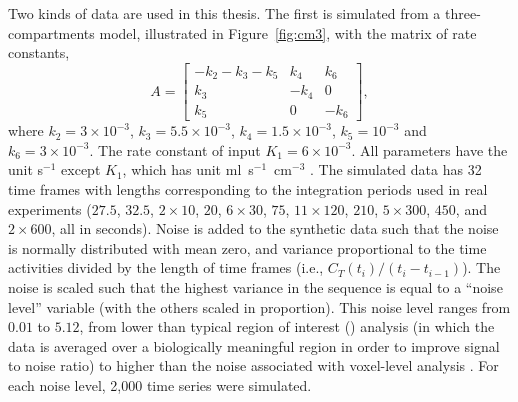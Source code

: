 Two kinds of data are used in this thesis. The first is simulated from a
three-compartments model, illustrated in Figure~\ref{fig:cm3}, with the
matrix of rate constants,
\begin{equation}
  A = \begin{bmatrix}
    - k_2 - k_3 - k_5 & k_4  & k_6 \\
    k_3               & -k_4 & 0   \\
    k_5               & 0    & -k_6
  \end{bmatrix},
\end{equation}
where $k_2 = 3 \times 10^{-3}$, $k_3 = 5.5 \times 10^{-3}$, $k_4 = 1.5 \times
10^{-3}$, $k_5 = 10^{-3}$ and $k_6 = 3 \times 10^{-3}$. The rate constant of
input $K_1 = 6\times 10^{-3}$. All parameters have the unit s$^{-1}$ except
$K_1$, which has unit ml~s$^{-1}$~cm$^{-3}$ \cite{RLNomen}. The simulated
data has 32 time frames with lengths corresponding to the integration periods
used in real experiments ($27.5$, $32.5$, $2 \times 10$, $20$, $6 \times 30$,
$75$, $11 \times 120$, $210$, $5 \times 300$, $450$, and $2 \times 600$, all
in seconds). Noise is added to the synthetic data such that the noise is
normally distributed with mean zero, and variance proportional to the time
activities divided by the length of time frames (i.e., $C_T(t_i)/(t_i -
t_{i-1})$). The noise is scaled such that the highest variance in the
sequence is equal to a ``noise level'' variable (with the others scaled in
proportion). This noise level ranges from $0.01$ to $5.12$, from lower than
typical region of interest (\roi) analysis (in which the data is averaged
over a biologically meaningful region in order to improve signal to noise
ratio) to higher than the noise associated with voxel-level analysis
\citep{Peng:2008fx}. For each noise level, 2,000 time series were simulated.



